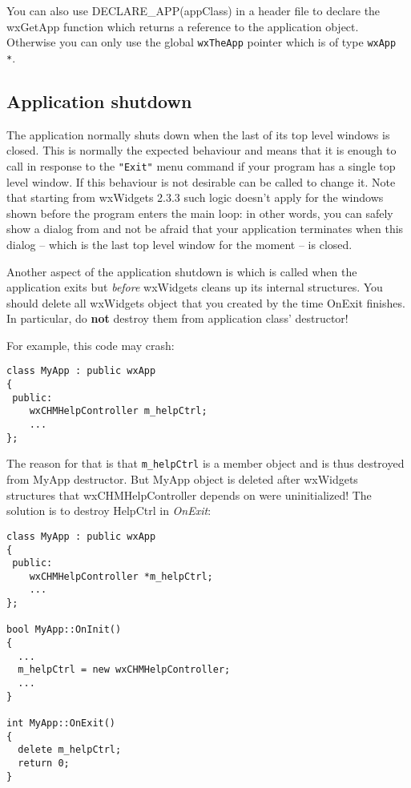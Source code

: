 You can also use DECLARE\_APP(appClass) in a header file to declare the wxGetApp function which returns
a reference to the application object. Otherwise you can only use the global 
\texttt{wxTheApp} pointer which is of type \texttt{wxApp *}.


\subsection{Application shutdown}\label{wxappshutdownoverview}

The application normally shuts down when the last of its top level windows is
closed. This is normally the expected behaviour and means that it is enough to
call  in response to the {\tt "Exit"} menu
command if your program has a single top level window. If this behaviour is not
desirable  can
be called to change it. Note that starting from wxWidgets 2.3.3 such logic
doesn't apply for the windows shown before the program enters the main loop: in
other words, you can safely show a dialog from 
 and not be afraid that your application
terminates when this dialog -- which is the last top level window for the
moment -- is closed.


Another aspect of the application shutdown is  
which is called when the application exits but {\it before} wxWidgets cleans up
its internal structures. You should delete all wxWidgets object that you
created by the time OnExit finishes. In particular, do {\bf not} destroy them
from application class' destructor!

For example, this code may crash:

\begin{verbatim}
class MyApp : public wxApp
{
 public:
    wxCHMHelpController m_helpCtrl;
    ...
};
\end{verbatim}

The reason for that is that {\tt m\_helpCtrl} is a member object and is 
thus destroyed from MyApp destructor. But MyApp object is deleted after 
wxWidgets structures that wxCHMHelpController depends on were 
uninitialized! The solution is to destroy HelpCtrl in {\it OnExit}:

\begin{verbatim}
class MyApp : public wxApp
{
 public:
    wxCHMHelpController *m_helpCtrl;
    ...
};

bool MyApp::OnInit()
{
  ...
  m_helpCtrl = new wxCHMHelpController;
  ...
}

int MyApp::OnExit()
{
  delete m_helpCtrl;
  return 0;
}
\end{verbatim}
